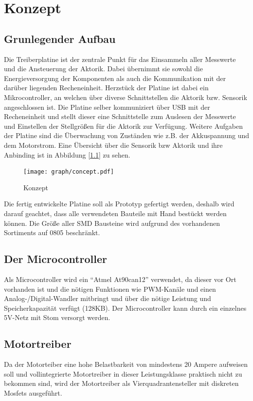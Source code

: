 
\chapter{Konzept}

\section{Grunlegender Aufbau}

Die Treiberplatine ist der zentrale Punkt für das Einsammeln aller Messwerte und die Ansteuerung der Aktorik. Dabei übernimmt sie sowohl die Energieversorgung der Komponenten als auch
die Kommunikation mit der darüber liegenden Recheneinheit. Herzstück der Platine ist dabei ein Mikrocontroller, an welchen über diverse Schnittstellen die Aktorik bzw. Sensorik
angeschlossen ist. Die Platine selber kommuniziert über USB mit der Recheneinheit und stellt dieser eine Schnittstelle zum Auslesen der Messwerte und Einstellen der Stellgrößen für die Aktorik
zur Verfügung. Weitere Aufgaben der Platine sind die Überwachung von Zuständen wie z.B. der Akkuspannung und dem Motorstrom. Eine Übersicht über die Sensorik bzw Aktorik und ihre Anbinding ist in 
Abbildung [\ref{fig:konzept}] zu sehen.

\begin{figure}[H]
\centering
\texttt{[image: graph/concept.pdf]}\\
\caption{Konzept}
\label{fig:konzept}
\end{figure}


Die fertig entwickelte Platine soll als Prototyp gefertigt werden, deshalb wird darauf geachtet, dass alle verwendeten Bauteile mit Hand bestückt werden können.
Die Größe aller SMD Bausteine wird aufgrund des vorhandenen Sortiments auf 0805 beschränkt.


\section{Der Microcontroller}
Als Microcontroller wird ein ``Atmel At90can12''\cite{ds-at90can} verwendet, da dieser vor Ort vorhanden ist und die nötigen Funktionen wie PWM-Kanäle und einen Analog-/Digital-Wandler mitbringt und 
über die nötige Leistung und Speicherkapazität verfügt (128KB). Der Microcontroller kann durch ein einzelnes 5V-Netz mit Stom versorgt werden.




\section{Motortreiber}
Da der Motorteiber eine hohe Belastbarkeit von mindestens 20 Ampere aufweisen soll und
vollintegrierte Motortreiber in dieser Leistungsklasse praktisch nicht zu bekommen sind, wird der Motortreiber als Vierquadrantensteller mit diskreten Mosfets ausgeführt.

